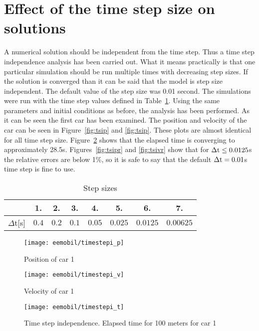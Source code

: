 		\section{Effect of the time step size on solutions}
		A numerical solution should be independent from the time step. Thus a time step independence analysis has been carried out. What it means practically is that one particular simulation should be run multiple times with decreasing step sizes. If the solution is converged than it can be said that the model is step size independent. The default value of the step size was 0.01 second. The simulations were run with the time step values defined in Table~\ref{tab:timestepsizes}.
		Using the same parameters and initial conditions as before, the analysis has been performed. As it can be seen the first car has been examined. The position and velocity of the car can be seen in Figure~\ref{fig:tsip} and \ref{fig:tsip}. These plots are almost identical for all time step size. Figure~\ref{fig:tsit} shows that the elapsed time is converging to approximately 28.5s. Figures~\ref{fig:tsipr} and \ref{fig:tsivr} show that for $\Delta \rm{t}\leq 0.0125$s the relative errors are below 1\%, so it is safe to say that the default $\Delta \rm{t}=0.01$s time step is fine to use.
		\begin{table}
			\begin{center}
				\begin{tabular}{ |c||c|c|c|c|c|c|c|}
					\hline
					&1. & 2. & 3. & 4. & 5. & 6. & 7.\\
					\hline
					$\Delta$t[s]& $0.4$ & $0.2$ & $0.1$ & $0.05$ & $0.025$ & $0.0125$ & $0.00625$\\
					\hline
				\end{tabular}
			\end{center}
			\caption{Step sizes}
			\label{tab:timestepsizes}
		\end{table}
		\begin{figure}
			\centering
			\begin{minipage}{.5\textwidth}
				\centering
				\texttt{[image: eemobil/timestepi\_p]}
				\caption{Position of car 1}
				\label{fig:tsip}
			\end{minipage}\hfill
			\begin{minipage}{.5\textwidth}
				\centering
				\texttt{[image: eemobil/timestepi\_v]}
				\caption{Velocity of car 1}
				\label{fig:tsiv}
			\end{minipage}
		\end{figure}
		\begin{figure}
			\centering
			\texttt{[image: eemobil/timestepi\_t]}
			\caption{Time step independence. Elapsed time for 100 meters for car 1}
			\label{fig:tsit}
		\end{figure}
